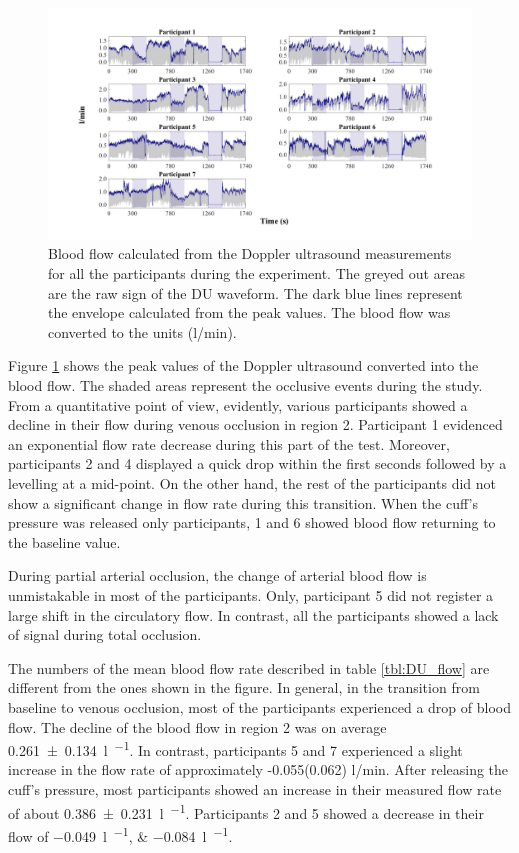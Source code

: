 \begin{figure}[!htb]
	\includegraphics[width=\textwidth,height=\textheight,keepaspectratio,trim={2.5cm 0cm 2.5cm 0 cm},clip]{figure16}    
	\caption[Blood flow calculated from Doppler ultrasond device all along the whole expetiment]{Blood flow calculated from the Doppler ultrasound measurements for all the participants during the experiment. The greyed out areas are the raw sign of the DU waveform. The dark blue lines represent the envelope calculated from the peak values. The blood flow was converted to the units (\si[per-mode=symbol]{\litre\per\minute}).}
	\label{fig:DU_flow}
\end{figure}

Figure \ref{fig:DU_flow} shows the peak values of the Doppler ultrasound converted into the blood flow. The shaded areas represent the occlusive events during the study. From a quantitative point of view, evidently, various participants showed a decline in their flow during venous occlusion in region 2.  Participant 1 evidenced an exponential flow rate decrease during this part of the test. Moreover, participants 2 and 4 displayed a quick drop within the first seconds followed by a levelling at a mid-point. On the other hand, the rest of the participants did not show a significant change in flow rate during this transition. When the cuff's pressure was released only participants, 1 and 6 showed blood flow returning to the baseline value.  

During partial arterial occlusion, the change of arterial blood flow is unmistakable in most of the participants. Only, participant 5 did not register a large shift in the circulatory flow. In contrast, all the participants showed a lack of signal during total occlusion. 

The numbers of the mean blood flow rate described in table \ref{tbl:DU_flow} are different from the ones shown in the figure. In general, in the transition from baseline to venous occlusion, most of the participants experienced a drop of blood flow. The decline of the blood flow in region 2 was on average \SI{0.261(0134)}{\litre\per\min}. In contrast, participants 5 and 7 experienced a slight increase in the flow rate of approximately -0.055(0.062) l/min. After releasing the cuff's pressure, most participants showed an increase in their measured flow rate of about \SI{0.386(0231)}{\litre\per\min}. Participants 2 and  5 showed a decrease in their flow of \SIlist{-0.049;-0.084}{\litre\per\min}. 

